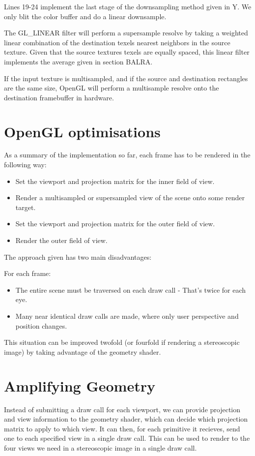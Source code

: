 \documentclass[12pt,a4paper,twoside,openright]{report}
\begin{document}
Lines 19-24 implement the last stage of the downsampling method given in Y. We only blit the color buffer and do a linear downsample. 

The GL\_LINEAR filter will perform a supersample resolve by taking a weighted linear combination of the destination texels nearest neighbors in the source texture. Given that the source textures texels are equally spaced, this linear filter implements the average given in section BALRA.

If the input texture is multisampled, and if the source and destination rectangles are the same size, OpenGL will perform a multisample resolve onto the destination framebuffer in hardware.

\section{OpenGL optimisations}

As a summary of the implementation so far, each frame has to be rendered in the following way:

\begin{itemize}
  \item Set the viewport and projection matrix for the inner field of view.
  \item Render a multisampled or supersampled view of the scene onto some render target.
  \item Set the viewport and projection matrix for the outer field of view.
  \item Render the outer field of view.
\end{itemize}
The approach given has two main disadvantages:

For each frame:
\begin{itemize}
  \item The entire scene must be traversed on each draw call - That's twice for each eye.
  \item Many near identical draw calls are made, where only user perspective and position changes.
\end{itemize}

This situation can be improved twofold (or fourfold if rendering a stereoscopic image) by taking advantage of the geometry shader.

\section{Amplifying Geometry}

Instead of submitting a draw call for each viewport, we can provide projection and view information to the geometry shader, which can decide which projection matrix to apply to which view. It can then, for each primitive it recieves, send one to each specified view in a single draw call. This can be used to render to the four views we need in a stereoscopic image in a single draw call.
\end{document}
